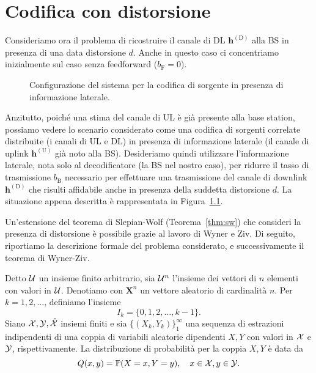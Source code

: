 \chapter{Codifica con distorsione}

Consideriamo ora il problema di ricostruire il canale di DL
\(\bm{h}^\mathrm{(D)}\) alla BS in presenza di una data distorsione \(d\).
Anche in questo caso ci concentriamo inizialmente sul caso senza feedforward
(\(b_\mathrm{F} = 0\)).

\begin{figure}[ht]
    \centering
    
    \caption{
        Configurazione del sistema per la codifica di sorgente in presenza di
        informazione laterale.
    }
    \label{fig:wz-configuration}
\end{figure}

Anzitutto, poiché una stima del canale di UL è già presente alla base station,
possiamo vedere lo scenario considerato come una codifica di sorgenti correlate
distribuite (i canali di UL e DL) in presenza di informazione laterale (il canale di
uplink \(\bm{h}^\mathrm{(U)}\) già noto alla BS). Desideriamo quindi utilizzare
l'informazione laterale, nota solo al decodificatore (la BS nel nostro caso),
per ridurre il tasso di trasmissione \(b_\mathrm{B}\) necessario per effettuare
una trasmissione del canale di downlink \(\bm{h}^\mathrm{(D)}\) che risulti
affidabile anche in presenza della suddetta distorsione \(d\). La situazione
appena descritta è rappresentata in Figura~\ref{fig:wz-configuration}.

Un'estensione del teorema di Slepian-Wolf (Teorema~\ref{thm:sw}) che consideri
la presenza di distorsione è possibile grazie al lavoro di Wyner e Ziv. Di
seguito, riportiamo la descrizione formale del problema considerato, e
successivamente il teorema di Wyner-Ziv.\cite{1055508}

Detto \(\mathcal{U}\) un insieme finito arbitrario, sia \(\mathcal{U}^n\) l'insieme dei
vettori di \(n\) elementi con valori in \(\mathcal{U}\). Denotiamo con \(\bm{X}^n\)
un vettore aleatorio di cardinalità \(n\). Per \(k=1,2,\dots\), definiamo
l'insieme
\begin{equation}
    I_k = \{0,1,2,\dots,k-1\}.
\end{equation}
Siano \(\mathcal{X},\mathcal{Y},\hat{\mathcal{X}}\) insiemi finiti e sia
\(\{(X_k,Y_k)\}_1^\infty\) una sequenza di estrazioni indipendenti di una
coppia di variabili aleatorie dipendenti \(X,Y\) con valori in \(\mathcal{X}\) e
\(\mathcal{Y}\), rispettivamente. La distribuzione di probabilità per la coppia
\(X,Y\) è data da
\begin{equation}
    Q(x,y) = \prob{X = x, Y = y}, \quad x \in \set{X}, y \in \set{Y}.
\end{equation}

